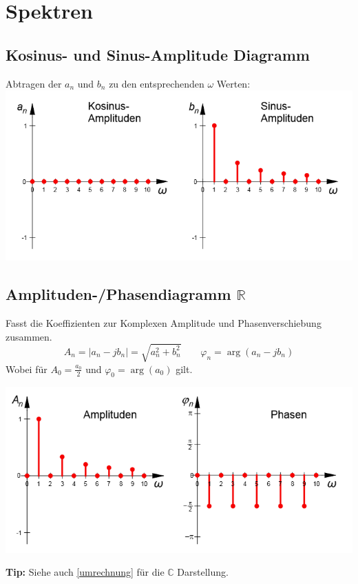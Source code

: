 \section{Spektren}
\subsection{Kosinus- und Sinus-Amplitude Diagramm}
Abtragen der $a_n$ und $b_n$ zu den entsprechenden $\omega$ Werten:\\
\includegraphics[width=\columnwidth]{Images/amplituden_diagram}


\subsection{Amplituden-/Phasendiagramm $\mathbb{R}$}
Fasst die Koeffizienten zur Komplexen Amplitude und Phasenverschiebung zusammen.\\
\[
A_n = \left|a_n - jb_n\right| = \sqrt{a_n^2 + b_n^2} \qquad \varphi_n = \arg(a_n - jb_n)
\]
Wobei für $A_0 = \frac{a_0}{2}$ und $\varphi_0 = \arg(a_0)$ gilt.

\includegraphics[width=\columnwidth]{Images/phasen_diagram}

\noindent\textbf{Tip:} Siehe auch \ref{umrechnung} für die $\mathbb{C}$ Darstellung.

